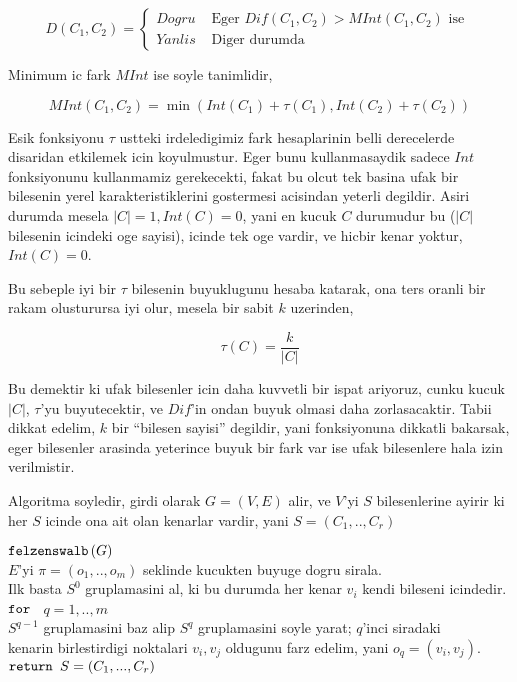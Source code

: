 \documentclass[12pt,fleqn]{article}\usepackage{../common}
\begin{document}
$$ 
D(C_1,C_2) = 
\left\{ \begin{array}{ll}
Dogru & \textrm{ Eger } Dif(C_1,C_2) > MInt(C_1,C_2) \textrm{ ise } \\
Yanlis & \textrm{ Diger durumda }
\end{array} \right.
 $$

Minimum ic fark $MInt$ ise soyle tanimlidir,

$$ 
MInt(C_1,C_2) = \min (Int(C_1)+\tau(C_1), Int(C_2)+\tau(C_2))
 $$

Esik fonksiyonu $\tau$ ustteki irdeledigimiz fark hesaplarinin belli
derecelerde disaridan etkilemek icin koyulmustur. Eger bunu kullanmasaydik
sadece $Int$ fonksiyonunu kullanmamiz gerekecekti, fakat bu olcut tek
basina ufak bir bilesenin yerel karakteristiklerini gostermesi acisindan yeterli
degildir. Asiri durumda mesela $|C| = 1,Int(C)=0$, yani en kucuk $C$
durumudur bu ($|C|$ bilesenin icindeki oge sayisi), icinde tek oge vardir,
ve hicbir kenar yoktur, $Int(C) = 0$.  

Bu sebeple iyi bir $\tau$ bilesenin buyuklugunu hesaba katarak, ona ters
oranli bir rakam olusturursa iyi olur, mesela bir sabit $k$ uzerinden,

$$ \tau(C) = \frac{k}{|C|} $$

Bu demektir ki ufak bilesenler icin daha kuvvetli bir ispat ariyoruz, cunku
kucuk $|C|$, $\tau$'yu buyutecektir, ve $Dif$'in ondan buyuk olmasi daha
zorlasacaktir. Tabii dikkat edelim, $k$ bir ``bilesen sayisi'' degildir,
yani fonksiyonuna dikkatli bakarsak, eger bilesenler arasinda yeterince
buyuk bir fark var ise ufak bilesenlere hala izin verilmistir.

Algoritma soyledir, girdi olarak $G=(V,E)$ alir, ve $V$'yi $S$
bilesenlerine ayirir ki her $S$ icinde ona ait olan kenarlar vardir, yani
$S=(C_1,..,C_r)$ 

\begin{algorithm}[h]
\begin{pseudocode}
\codename $\mbox{\texttt{felzenswalb}}\left(G\right)$\\
\codeline \> $E$'yi $\pi = (o_1,..,o_m)$ seklinde kucukten buyuge dogru sirala. \\
\codeline \> Ilk basta $S^0$ gruplamasini al, ki bu durumda her kenar $v_i$ kendi bileseni icindedir. \\
\codeline \> $\mbox{\texttt{for }}$ $q = 1,..,m$ \\
\codeline \> \> $S^{q-1}$ gruplamasini baz alip $S^q$ gruplamasini soyle
yarat; $q$'inci siradaki \\
\codeline \> \> kenarin birlestirdigi noktalari $v_i,v_j$ oldugunu farz edelim, yani $o_q = (v_i,v_j)$. 
\\
\codeline \> $\mbox{\texttt{return }} S=(C_1,...,C_r)$ 
\end{pseudocode}
\end{algorithm}
\end{document}
